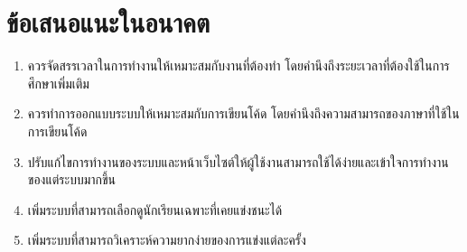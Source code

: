 \section{ข้อเสนอแนะในอนาคต}

\begin{enumerate}
    \item ควรจัดสรรเวลาในการทำงานให้เหมาะสมกับงานที่ต้องทำ โดยคำนึงถึงระยะเวลาที่ต้องใช้ในการศึกษาเพิ่มเติม
    \item ควรทำการออกแบบระบบให้เหมาะสมกับการเขียนโค้ด โดยคำนึงถึงความสามารถของภาษาที่ใช้ในการเขียนโค้ด
    \item ปรับแก้ไขการทำงานของระบบและหน้าเว็บไซต์ให้ผู้ใช้งานสามารถใช้ได้ง่ายและเข้าใจการทำงานของแต่ระบบมากขึ้น
    \item เพิ่มระบบที่สามารถเลือกดูนักเรียนเฉพาะที่เคยแข่งชนะได้
    \item เพิ่มระบบที่สามารถวิเคราะห์ความยากง่ายของการแข่งแต่ละครั้ง
\end{enumerate}